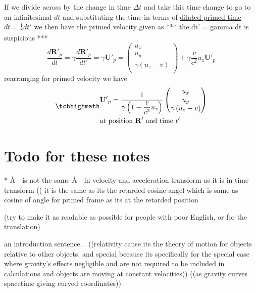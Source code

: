 If we divide across by the change in time $\Delta t$ and take this time change to go to an infinitesimal $dt$ and substituting the time in terms of \hyperlink{def-time-dilation}{dilated primed time} $dt = \frac{1}{\gamma}dt'$ we then have the primed velocity given as *** the dt' = gamma dt is suspicious ***
\begin{equation}%
    \dfrac{d \mathbf{R}'_p}{dt} =\gamma \dfrac{d \mathbf{R}'_p}{dt'} = \gamma\mathbf{U'}_p   = \begin{pmatrix}
        u_x \\ u_y  \\ \gamma \left( u_z  - v  \right) \\
    \end{pmatrix} + \gamma\dfrac{v}{c^2} u_z  \mathbf{U'}_p
\end{equation}%
rearranging for primed velocity we have
\begin{equation}%
    \mhl{
        \begin{aligned}
            & \mathbf{U'}_p = \dfrac{1}{\gamma\left(1- \dfrac{v}{c^2} u_z\right) }\begin{pmatrix}
               u_x \\ u_y  \\ \gamma \left( u_z  - v  \right) \\
            \end{pmatrix} \\
            & \text{at position $\mathbf{R'}$ and time $t'$ }
        \end{aligned}
    }
\end{equation}%
\chapter{Todo for these notes}
* \AA \ \ is not the same \AA \ \ in velocity and acceleration transform as it is in time transform (( it is the same as its the retarded cosine angel which is same as cosine of angle for primed frame as its at the retarded position

(try to make it as readable as possible for people with poor English, or for the translation)

an introduction sentence... ((relativity cause its the theory of motion for objects relative to other objects, and special because its specifically for the special case where gravity's effects negligible and are not required to be included in calculations and objects are moving at constant velocities)) ((as gravity curves spacetime giving curved coordinates))

